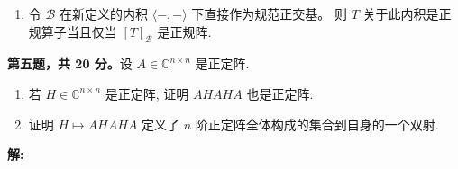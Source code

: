 \begin{enumerate}
\begin{enumerate}
\[\begin{pmatrix} 0 & 0 & 0 & - 2 \\ 1 & 0 & 0 & 0 \\ 0 & 1 & 0 & - 3 \\ 0 & 0 & 1 & 0 \end{pmatrix}.\]

\item
  计算 \(xI_{6} - A\) 与 \(xI_{6} - B\) 的行列式因子可知它们相似.
  或者更直接地, 注意到 \(xI_{2} - B_{1}\) 相抵于
  \(\begin{pmatrix}1 & \\ & x^{2} + 1 \end{pmatrix}\), 
  \(xI_{2} - B_{2}\) 相抵于
  \(\begin{pmatrix}1 & \\ & x^{2} + 1 \end{pmatrix}\), 
  \(xI_{2} - B_{3}\) 相抵于
  \(\begin{pmatrix}1 & \\ & x^{2} + 2 \end{pmatrix}\).
  故 \(xI_{6} - B\) 相抵于
  \(\operatorname{diag}(1, 1, 1, 1, x^{2} + 1, x^{2} + 1, x^{2} + 2)\).
  而类似地, \(xI_{6} - A\) 相抵于
  \(\operatorname{diag}(1, x^{2} + 1, 1, 1, 1, 1, (x^{2} + 1)(x^{2} + 2))\).
 故它们的行列式因子相同. 故有理标准型相同.
  \end{enumerate}

现在证明了 $A$ 与 $B$ 在实数域上相似, 故存在一组基 $\mathcal{B}$ 使得 \([T]_{\mathcal{B}} = B\).

\def\labelenumi{\arabic{enumi}.}
\item
  令 \(\mathcal{B}\) 在新定义的内积 \(\langle -, - \rangle\) 下直接作为规范正交基。
  则 \(T\) 关于此内积是正规算子当且仅当 \([T]_{\mathcal{B}}\) 是正规阵.
\end{enumerate}

\textbf{第五题，共 20 分。}设 \(A \in \mathbb{C}^{n \times n}\) 是正定阵.

\begin{enumerate}
\def\labelenumi{\arabic{enumi}.}
\item
  若 \(H \in \mathbb{C}^{n \times n}\) 是正定阵, 证明 $AHAHA$ 也是正定阵.
\item
  证明 \(H \mapsto AHAHA\) 定义了 \(n\) 阶正定阵全体构成的集合到自身的一个双射.
\end{enumerate}

\textbf{解:}

